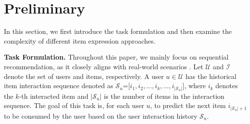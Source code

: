 \documentclass[sigconf]{acmart}
\begin{document}





\section{Preliminary}
In this section, we first introduce the task formulation and then examine the complexity of different item expression approaches.

\smallskip
\noindent\textbf{Task Formulation. }
Throughout this paper, we mainly focus on sequential recommendation, as it closely aligns with real-world scenarios \cite{tian2022multi,xie2022decoupled}.
Let $\mathcal{U}$ and $\mathcal{I}$ denote the set of users and items, respectively. A user $u\in \mathcal{U}$ has the historical item interaction sequence denoted as $\mathcal{S}_u$=[$i_1, i_2, ..., i_k, ..., i_{|\mathcal{S}_{u}|}$], where $i_k$ denotes the $k$-th interacted item and $|\mathcal{S}_u|$ is the number of items in the interaction sequence. The goal of this task is, for each user $u$, to predict the next item $i_{|\mathcal{S}_u|+1}$ to be consumed by the user based on the user interaction history $\mathcal{S}_u$.

\end{document}
